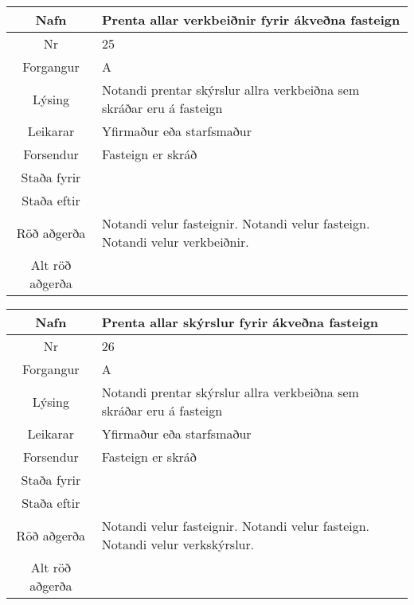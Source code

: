 \caption{Use case 24}\label{tab:use_case_24}
\begin{table}[h!]\centering
\begin{tabular}{|c|p{10cm}|}
\hline
Nafn&Prenta allar verkbeiðnir fyrir ákveðna fasteign\\
\hline
Nr&25\\
\hline
Forgangur&A\\
\hline
Lýsing&Notandi prentar skýrslur allra verkbeiðna sem skráðar eru á fasteign\\
\hline
Leikarar&Yfirmaður eða starfsmaður\\
\hline
Forsendur&Fasteign er skráð\\
\hline
Staða fyrir&\\
\hline
Staða eftir&\\
\hline
Röð aðgerða&Notandi velur fasteignir. Notandi velur fasteign. Notandi velur verkbeiðnir.\\
\hline
Alt röð aðgerða&\\
\hline
\end{tabular}
\end{table}
\caption{Use case 25}\label{tab:use_case_25}
\begin{table}[h!]\centering
\begin{tabular}{|c|p{10cm}|}
\hline
Nafn&Prenta allar skýrslur fyrir ákveðna fasteign\\
\hline
Nr&26\\
\hline
Forgangur&A\\
\hline
Lýsing&Notandi prentar skýrslur allra verkbeiðna sem skráðar eru á fasteign\\
\hline
Leikarar&Yfirmaður eða starfsmaður\\
\hline
Forsendur&Fasteign er skráð\\
\hline
Staða fyrir&\\
\hline
Staða eftir&\\
\hline
Röð aðgerða&Notandi velur fasteignir. Notandi velur fasteign. Notandi velur verkskýrslur.\\
\hline
Alt röð aðgerða&\\
\hline
\end{tabular}
\end{table}
\caption{Use case 26}\label{tab:use_case_26}
